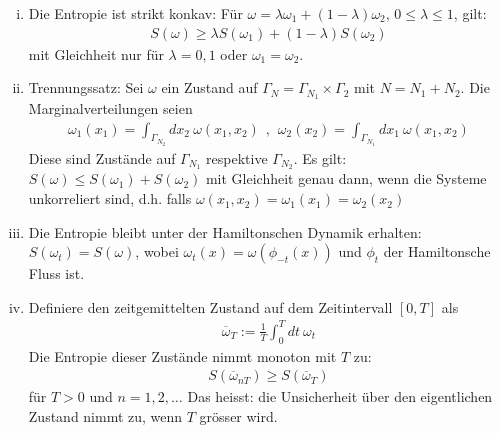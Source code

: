 \begin{lemma}


    \begin{enumerate}[(i)]
        \item Die Entropie ist strikt konkav: Für $\omega = \lambda \omega_1
            + (1-\lambda) \omega_2$, $0 \leq \lambda \leq 1$, gilt:
            \begin{align*}
                S(\omega) \geq \lambda S(\omega_1) + (1-\lambda) S(\omega_2)
            \end{align*}
            mit Gleichheit nur für $\lambda=0,1$ oder $\omega_1 = \omega_2$.
        \item Trennungssatz: Sei $\omega$ ein Zustand auf $\Gamma_N = \Gamma_{N_1}
            \times \Gamma_2$ mit $N=N_1+N_2$. Die Marginalverteilungen seien
            \begin{align*}
                \omega_1(x_1) = \int_{\Gamma_{N_2}} dx_2 \ \omega(x_1,x_2)
                \hspace{5pt} , \hspace{5pt}
                \omega_2(x_2) = \int_{\Gamma_{N_1}} dx_1 \ \omega(x_1,x_2)
            \end{align*}
            Diese sind Zustände auf $\Gamma_{N_1}$ respektive $\Gamma_{N_2}$.
            Es gilt: $S(\omega) \leq S(\omega_1) + S(\omega_2)$ mit
            Gleichheit genau dann, wenn die Systeme unkorreliert sind, d.h.
            falls $\omega(x_1,x_2) = \omega_1(x_1) = \omega_2 (x_2)$
        \item Die Entropie bleibt unter der Hamiltonschen Dynamik erhalten:
            $S(\omega_t) = S(\omega)$, wobei $\omega_t(x) = \omega(\phi_{-t}(x))$
            und $\phi_t$ der Hamiltonsche Fluss ist.
        \item Definiere den zeitgemittelten Zustand auf dem Zeitintervall $[0,T]$
            als
            \begin{align*}
                \overline{\omega}_T := \frac{1}{T} \int_0^T dt \ \omega_t
            \end{align*}
            Die Entropie dieser Zustände nimmt monoton mit $T$ zu:
            \begin{align*}
                S(\overline{\omega}_{nT}) \geq S(\overline{\omega}_T)
            \end{align*}
            für $T>0$ und $n=1,2,\dots$ Das heisst: die Unsicherheit über den
            eigentlichen Zustand nimmt zu, wenn $T$ grösser wird.
    \end{enumerate}
\end{lemma}

